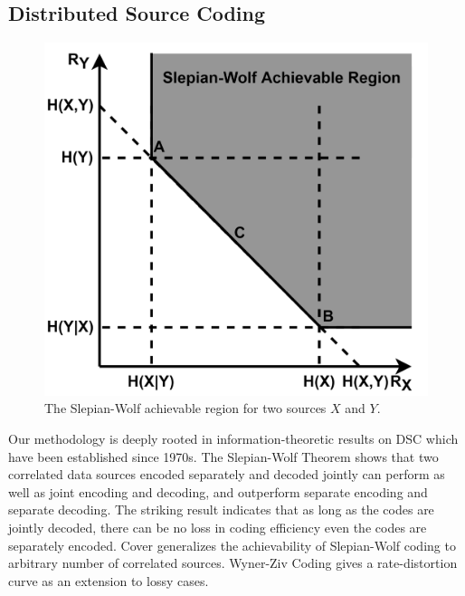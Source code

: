 \documentclass[10pt,twocolumn,letterpaper]{article}
\begin{document}
\subsection{Distributed Source Coding}

\begin{figure}[t]
\begin{center}
\includegraphics[width=0.8\linewidth]{SlepianWolf.pdf}
\end{center}
   \caption{The Slepian-Wolf achievable region for two sources $X$ and $Y$.}
\label{fig_2}
\end{figure}
Our methodology is deeply rooted in information-theoretic results on DSC which have been established since 1970s. The Slepian-Wolf \cite{slepian1973noiseless} Theorem shows that two correlated data sources encoded separately and decoded jointly can perform as well as joint encoding and decoding, and outperform separate encoding and separate decoding. The striking result indicates that as long as the codes are jointly decoded, there can be no loss in coding efficiency even the codes are separately encoded. Cover \cite{cover1975proof} generalizes the achievability of Slepian-Wolf coding to arbitrary number of correlated sources. Wyner-Ziv Coding \cite{wyner1976rate} gives a rate-distortion curve as an extension to lossy cases.
\end{document}
